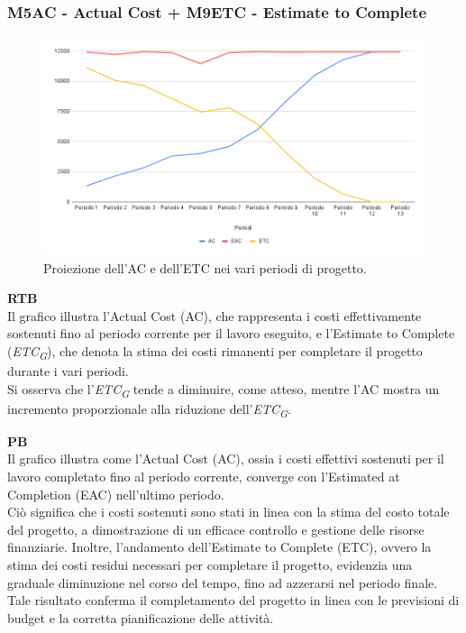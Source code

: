 \subsubsection{M5AC - Actual Cost + M9ETC - Estimate to Complete}

\vspace{0.3cm}

\begin{figure}[H]
    \centering
    \includegraphics[width=1\textwidth]{../Images/PianoDiQualifica/AC_ETC.png}
    \caption{Proiezione dell’AC e dell’ETC nei vari periodi di progetto.}
    \label{fig:4}
\end{figure}

\vspace{0.2cm}

\textbf{RTB} \\
Il grafico illustra l'Actual Cost (AC), che rappresenta i costi effettivamente sostenuti fino al periodo corrente per il lavoro eseguito, e l'Estimate to Complete (\textit{ETC}\textsubscript{\textit{G}}), che denota la stima dei costi rimanenti per completare il progetto durante i vari periodi. \\
Si osserva che l'\textit{ETC}\textsubscript{\textit{G}} tende a diminuire, come atteso, mentre l'AC mostra un incremento proporzionale alla riduzione dell'\textit{ETC}\textsubscript{\textit{G}}.

\vspace{0.3cm}

\textbf{PB} \\
Il grafico illustra come l'Actual Cost (AC), ossia i costi effettivi sostenuti per il lavoro completato fino al periodo corrente, converge con l'Estimated at Completion (EAC) nell'ultimo periodo. \\
Ciò significa che i costi sostenuti sono stati in linea con la stima del costo totale del progetto, a dimostrazione di un efficace controllo e gestione delle risorse finanziarie. Inoltre, l'andamento dell'Estimate to Complete (ETC), ovvero la stima dei costi residui necessari per completare il progetto, evidenzia una graduale diminuzione nel corso del tempo, fino ad azzerarsi nel periodo finale. \\
Tale risultato conferma il completamento del progetto in linea con le previsioni di budget e la corretta pianificazione delle attività.

